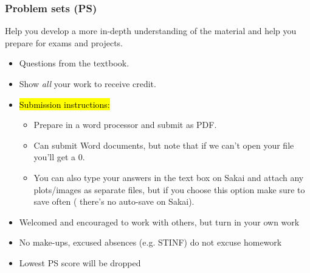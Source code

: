\documentclass[11pt,containsverbatim,handout,xcolor=xelatex,dvipsnames,table]{beamer}
\begin{document}

\begin{frame}
\frametitle{Problem sets (PS)}

 Help you develop a more in-depth understanding of the material and 
help you prepare for exams and projects.

\begin{itemize}

\item Questions from the textbook.

\item Show \emph{all} your work to receive credit.

\item \hl{Submission instructions:}
\begin{itemize}
\item Prepare in a word processor and submit as PDF.
\item Can submit Word documents, but note that if we can't open your file you'll 
get a 0.
\item You can also type your answers in the text box on Sakai and attach any 
plots/images as separate files, but if you choose this option make sure to save often (
there's no auto-save on Sakai).
\end{itemize}

\item Welcomed and encouraged to work with others, but turn in your own work

\item No make-ups, excused absences (e.g. STINF) do not excuse homework

\item Lowest PS score will be dropped

\end{itemize}


\end{frame}

\end{document}
